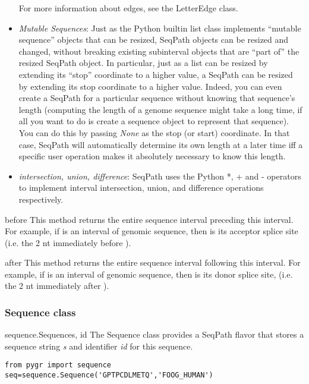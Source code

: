 \documentclass{howto}
\begin{document}
\begin{itemize}
For more information about edges, see the LetterEdge class.

\item
{\em Mutable Sequences}: Just as the Python builtin list class implements
``mutable sequence'' objects that can be resized, SeqPath objects can be
resized and changed, without breaking existing subinterval objects that
are ``part of'' the resized SeqPath object.  In particular, just as a list
can be resized by extending its ``stop'' coordinate to a higher value, a SeqPath can
be resized by extending its stop coordinate to a higher value.  Indeed,
you can even create a SeqPath for a particular sequence without knowing that
sequence's length (computing the length of a genome sequence might take a long
time, if all you want to do is create a sequence object to represent that
sequence).  You can do this by passing {\em None} as the stop (or start)
coordinate.  In that case, SeqPath will automatically determine its own
length at a later time iff a specific user operation makes it absolutely 
necessary to know this length.

\item
{\em intersection, union, difference}: SeqPath uses the Python *, + and - 
operators to implement interval intersection, union, and difference
operations respectively.

\end{itemize}

\begin{funcdesc}{before}{} 
  This method returns the entire sequence interval preceding this interval.
  For example, if  is an interval of genomic sequence, then
   is its acceptor splice site (i.e. the 2 nt immediately
  before ).
\end{funcdesc}

\begin{funcdesc}{after}{} 
  This method returns the entire sequence interval following this interval.
  For example, if  is an interval of genomic sequence, then
   is its donor splice site, (i.e. the 2 nt immediately
  after ).
\end{funcdesc}


\subsubsection{Sequence class}

\begin{funcdesc}{sequence.Sequence}{s, id}
  The Sequence class provides a SeqPath flavor that stores a sequence string
  {\em s} and identifier {\em id} for this sequence.

\begin{verbatim}
from pygr import sequence
seq=sequence.Sequence('GPTPCDLMETQ','FOOG_HUMAN')
\end{verbatim}
\end{funcdesc}
\end{document}
